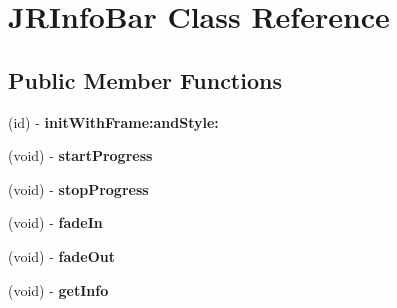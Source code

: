 \hypertarget{interface_j_r_info_bar}{
\section{JRInfoBar Class Reference}
\label{interface_j_r_info_bar}
}
\subsection*{Public Member Functions}
\begin{DoxyCompactItemize}
\item 
\hypertarget{interface_j_r_info_bar_a4be00af336e66b943e5685873708271e}{
(id) -\/ {\bfseries initWithFrame:andStyle:}}
\label{interface_j_r_info_bar_a4be00af336e66b943e5685873708271e}

\item 
\hypertarget{interface_j_r_info_bar_ae29dd90e5561293b58c037a58ae71bd4}{
(void) -\/ {\bfseries startProgress}}
\label{interface_j_r_info_bar_ae29dd90e5561293b58c037a58ae71bd4}

\item 
\hypertarget{interface_j_r_info_bar_a54ea22f48e0efeda622f45496e76ed5a}{
(void) -\/ {\bfseries stopProgress}}
\label{interface_j_r_info_bar_a54ea22f48e0efeda622f45496e76ed5a}

\item 
\hypertarget{interface_j_r_info_bar_a5bcdb492399fd7cf1999d7e74c8a638f}{
(void) -\/ {\bfseries fadeIn}}
\label{interface_j_r_info_bar_a5bcdb492399fd7cf1999d7e74c8a638f}

\item 
\hypertarget{interface_j_r_info_bar_ac7a038f35623995057aa33cc396ea25f}{
(void) -\/ {\bfseries fadeOut}}
\label{interface_j_r_info_bar_ac7a038f35623995057aa33cc396ea25f}

\item 
\hypertarget{interface_j_r_info_bar_ab34f35069e1f298ae9f5af4206ad8ec6}{
(void) -\/ {\bfseries getInfo}}
\label{interface_j_r_info_bar_ab34f35069e1f298ae9f5af4206ad8ec6}

\end{DoxyCompactItemize}

